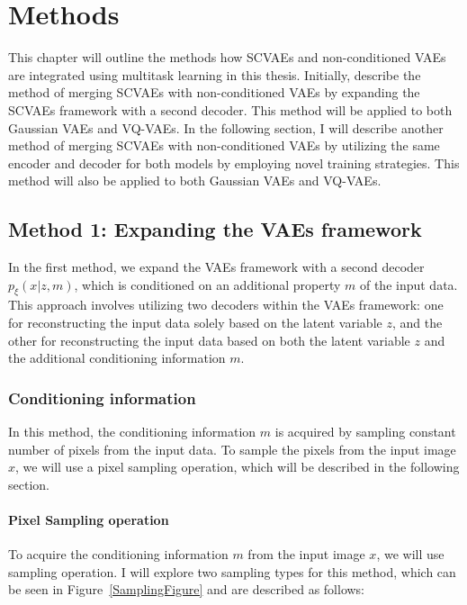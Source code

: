 \chapter{Methods}

This chapter will outline the methods how SCVAEs and non-conditioned VAEs are integrated using multitask learning in this thesis. Initially, describe the method of merging SCVAEs with non-conditioned VAEs by expanding the SCVAEs framework with a second decoder. This method will be applied to both Gaussian VAEs and VQ-VAEs. In the following section, I will describe another method of merging SCVAEs with non-conditioned VAEs by utilizing the same encoder and decoder for both models by employing novel training strategies. This method will also be applied to both Gaussian VAEs and VQ-VAEs.

\section{Method 1: Expanding the VAEs framework}

In the first method, we expand the VAEs framework with a second decoder $p_\xi(x|z,m)$, which is conditioned on an additional property $m$ of the input data. This approach involves utilizing two decoders within the VAEs framework: one for reconstructing the input data solely based on the latent variable $z$, and the other for reconstructing the input data based on both the latent variable $z$ and the additional conditioning information $m$.

\subsection{Conditioning information}

In this method, the conditioning information $m$ is acquired by sampling constant number of pixels from the input data. To sample the pixels from the input image $x$, we will use a pixel sampling operation, which will be described in the following section.

\subsubsection{Pixel Sampling operation}

To acquire the conditioning information $m$ from the input image $x$, we will use sampling operation. I will explore two sampling types for this method, which can be seen in Figure~\ref{SamplingFigure} and are described as follows: 

